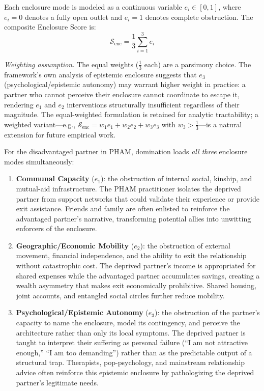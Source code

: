\documentclass[12pt,openany]{book}
\numberwithin{equation}{chapter}
\begin{document}
Each enclosure mode is modeled as a continuous variable $e_i \in [0,1]$, where
$e_i = 0$ denotes a fully open outlet and $e_i = 1$ denotes complete obstruction.
The composite Enclosure Score is:
\begin{equation}\label{eq:enc1-enclosure-score}
\mathcal{S}_{\text{enc}} = \frac{1}{3}\sum_{i=1}^{3} e_i
\end{equation}

\noindent\textit{Weighting assumption.} The equal weights ($\tfrac{1}{3}$ each) are a parsimony choice. The framework's own analysis of epistemic enclosure suggests that $e_3$ (psychological/epistemic autonomy) may warrant higher weight in practice: a partner who cannot perceive their enclosure cannot coordinate to escape it, rendering $e_1$ and $e_2$ interventions structurally insufficient regardless of their magnitude. The equal-weighted formulation is retained for analytic tractability; a weighted variant---e.g., $\mathcal{S}_{\text{enc}} = w_1 e_1 + w_2 e_2 + w_3 e_3$ with $w_3 > \tfrac{1}{3}$---is a natural extension for future empirical work.

For the disadvantaged partner in PHAM, domination loads \textit{all three} enclosure
modes simultaneously:

\begin{enumerate}
    \item \textbf{Communal Capacity} ($e_1$): the obstruction of internal
    social, kinship, and mutual-aid infrastructure. The PHAM practitioner isolates
    the deprived partner from support networks that could validate their experience
    or provide exit assistance. Friends and family are often enlisted to reinforce
    the advantaged partner's narrative, transforming potential allies into unwitting
    enforcers of the enclosure.

    \item \textbf{Geographic/Economic Mobility} ($e_2$): the obstruction of
    external movement, financial independence, and the ability to exit the relationship
    without catastrophic cost. The deprived partner's income is appropriated for shared
    expenses while the advantaged partner accumulates savings, creating a wealth asymmetry
    that makes exit economically prohibitive. Shared housing, joint accounts, and
    entangled social circles further reduce mobility.

    \item \textbf{Psychological/Epistemic Autonomy} ($e_3$): the obstruction of
    the partner's capacity to name the enclosure, model its contingency, and
    perceive the architecture rather than only its local symptoms. The deprived partner
    is taught to interpret their suffering as personal failure (``I am not attractive
    enough,'' ``I am too demanding'') rather than as the predictable output of a
    structural trap. Therapists, pop-psychology, and mainstream relationship advice
    often reinforce this epistemic enclosure by pathologizing the deprived partner's
    legitimate needs.
\end{enumerate}
\end{document}
